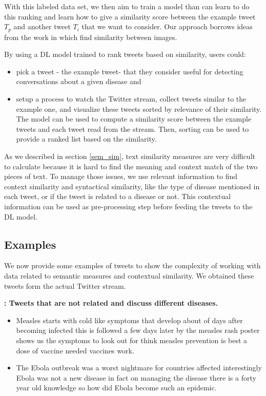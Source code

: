 \documentclass[12pt]{report}
\begin{document}
With this labeled data set, we then aim to train a model than can learn to do this ranking and learn how to give a similarity score between 
the example tweet $T_p$ and another tweet $T_i$ that we want to consider. Our approach borrows ideas from the work in \cite{Wang2014} which find  similarity between images. 

By using a \ac{DL} model trained to rank tweets based on similarity, users could: 
\begin{itemize}
	\item pick a tweet - the example tweet- that they consider useful for detecting conversations about a given disease and
	\item setup a process to watch the Twitter stream, collect tweets similar  to the example one, and visualize these tweets  sorted by 
	relevance of their similarity. The model can be used to compute a similarity score between the example tweets and each tweet read from the stream. Then, sorting can be used to provide a ranked list based on the similarity.
\end{itemize} 

As we described in section \ref{sem_sim},   text similarity measures are very difficult to calculate  because it is hard to find the meaning and context match of the two pieces of text. To manage those issues, we use relevant information to find context similarity and syntactical similarity, like the type of disease mentioned in each tweet,  or if the tweet is related to a disease or not. This contextual information can be used as pre-processing step before feeding 
the tweets to the \ac{DL} model.


\subsection{Examples}
We now provide some examples of tweets to show the complexity of working with data related to semantic measures and contextual similarity.
We obtained these tweets form the actual Twitter stream.

\begin{definition} {\bf : Tweets that are not related and discuss different diseases.}
	\begin{itemize}[nolistsep]
		\item Measles starts with cold like symptoms that develop about of days after becoming infected this is followed a few days later by the measles rash poster shows us the symptoms to look out for think measles prevention is best a dose of vaccine needed vaccines work.
		\item The Ebola outbreak was a worst nightmare for countries affected interestingly Ebola was not a new disease in fact on managing the disease there is a forty year old knowledge so how did Ebola become such an epidemic.
	\end{itemize}
\end{definition}
\end{document}
